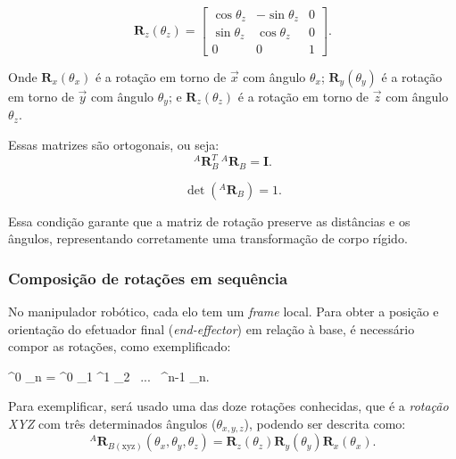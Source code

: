 \begin{equation}
    \label{eq:rotacao_Z}
\mathbf{R}_z(\theta_z) = 
\begin{bmatrix}
\cos\theta_z & -\sin\theta_z & 0 \\
\sin\theta_z &  \cos\theta_z & 0 \\
0            &  0            & 1
\end{bmatrix}.
\end{equation}

Onde $\mathbf{R}_x(\theta_x)$ é a rotação em torno de $\vec{x}$ com ângulo $\theta_x$; $\mathbf{R}_y(\theta_y)$ é a rotação em torno de $\vec{y}$ com ângulo $\theta_y$; e $\mathbf{R}_z(\theta_z)$ é a rotação em torno de $\vec{z}$ com ângulo $\theta_z$.

Essas matrizes são ortogonais, ou seja:
\begin{equation}
\label{eq:Ortogonal_matrizRotacao}
{}^A \mathbf{R}_B^{T}\,{}^A \mathbf{R}_B = \mathbf{I}.
\end{equation}

\begin{equation}
\det\!\left({}^A \mathbf{R}_B\right) = 1.
\end{equation}

Essa condição garante que a matriz de rotação preserve as distâncias e os ângulos, representando corretamente uma transformação de corpo rígido. 

\subsubsection{Composição de rotações em sequência}
No manipulador robótico, cada elo tem um \emph{frame} local. Para obter a posição e orientação do efetuador final (\emph{end-effector}) em relação à base, é necessário compor as rotações, como exemplificado:

{{}^0 _n =
{}^0 _1
{}^1 _2  \, ... \,
{}^{n-1} _n.}

Para exemplificar, será usado uma das doze rotações conhecidas, que é a \emph{rotação XYZ} com três determinados ângulos ($\theta_{x,y,z}$), podendo ser descrita como:
\begin{equation}
    \label{rotacao_XYZ1}
{}^A \mathbf{R}_{B(\text{xyz})}(\theta_x,\theta_y,\theta_z) =
\mathbf{R}_z(\theta_z)
\mathbf{R}_y(\theta_y)
\mathbf{R}_x(\theta_x).
\end{equation}

